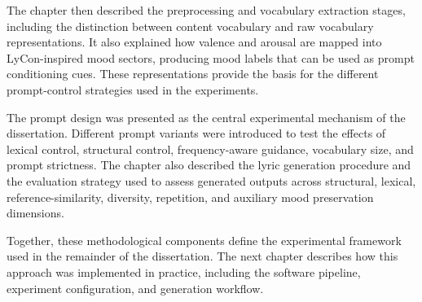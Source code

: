 The chapter then described the preprocessing and vocabulary extraction stages, including the distinction between content vocabulary and raw vocabulary representations. It also explained how valence and arousal are mapped into LyCon-inspired mood sectors, producing mood labels that can be used as prompt conditioning cues. These representations provide the basis for the different prompt-control strategies used in the experiments.

The prompt design was presented as the central experimental mechanism of the dissertation. Different prompt variants were introduced to test the effects of lexical control, structural control, frequency-aware guidance, vocabulary size, and prompt strictness. The chapter also described the lyric generation procedure and the evaluation strategy used to assess generated outputs across structural, lexical, reference-similarity, diversity, repetition, and auxiliary mood preservation dimensions.

Together, these methodological components define the experimental framework used in the remainder of the dissertation. The next chapter describes how this approach was implemented in practice, including the software pipeline, experiment configuration, and generation workflow.

